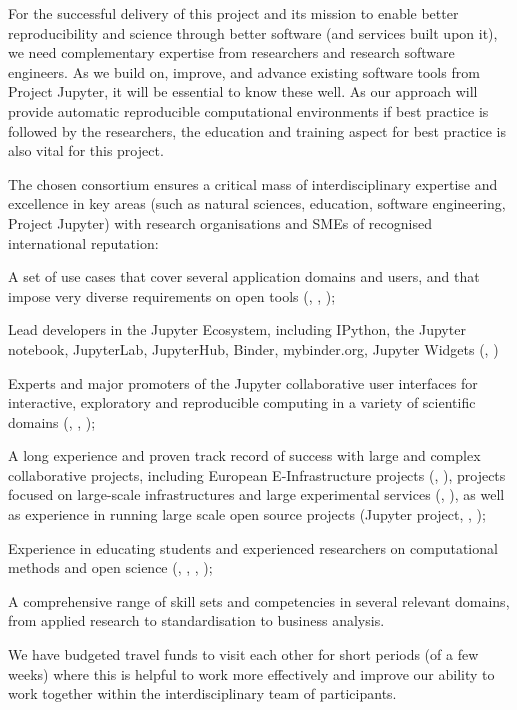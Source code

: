 For the successful delivery of this project and its mission to enable better
reproducibility and science through better software (and services built upon it),
we need complementary expertise from researchers and research software
engineers. As we build on, improve, and advance existing software tools from
Project Jupyter, it will be essential to know these well. As our approach will
provide automatic reproducible computational environments if best practice is
followed by the researchers, the education and training aspect for best practice
is also vital for this project.

The chosen consortium ensures a critical mass of interdisciplinary expertise and
excellence in key areas (such as natural sciences, education, software
engineering, Project Jupyter) with research organisations and SMEs of recognised
international reputation:
\begin{compactitem}
\item A set of use cases that cover several application domains and users, and that impose very diverse
requirements on open tools (, , );
\item Lead developers in the Jupyter Ecosystem, including IPython, the Jupyter notebook, JupyterLab,
JupyterHub, Binder, mybinder.org, Jupyter Widgets (, )
\item Experts and major promoters of the Jupyter collaborative user interfaces
  for interactive, exploratory and reproducible computing in a variety of scientific domains (, , );
\item A long experience and proven track record of success with large and complex collaborative projects,
including European E-Infrastructure projects (, ),
projects focused on large-scale infrastructures and large experimental services (, ),
as well as experience in running large scale open source projects (Jupyter
project, , );
\item Experience in educating students and experienced researchers on
  computational methods and open science (, , , );
\item A comprehensive range of skill sets and competencies in several relevant domains,
from applied research to standardisation to business analysis.
\end{compactitem}

We have budgeted travel funds to visit each other for short periods (of a few
weeks) where this is helpful to work more effectively and improve our ability to
work together within the interdisciplinary team of participants.

